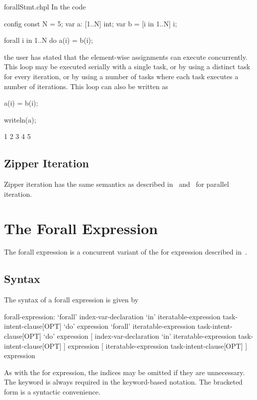 \begin{chapelexample}{forallStmt.chpl}
In the code
\begin{chapelpre}
config const N = 5;
var a: [1..N] int;
var b = [i in 1..N] i;
\end{chapelpre}
\begin{chapel}
forall i in 1..N do
  a(i) = b(i);
\end{chapel}
the user has stated that the element-wise assignments can execute
concurrently.  This loop may be executed serially with a single task,
or by using a distinct task for every iteration, or by using a number
of tasks where each task executes a number of iterations.  This loop
can also be written as
\begin{chapel}
[i in 1..N] a(i) = b(i);
\end{chapel}
\begin{chapelpost}
writeln(a);
\end{chapelpost}
\begin{chapeloutput}
1 2 3 4 5
\end{chapeloutput}
\end{chapelexample}

\subsection{Zipper Iteration}
\label{forall_zipper}

Zipper iteration has the same semantics as described
in~ and~ for parallel
iteration.

\pagebreak
\section{The Forall Expression}
\label{Forall_Expressions}

The forall expression is a concurrent variant of the for expression
described in~.

\subsection{Syntax}
\label{forall_expr_syntax}

The syntax of a forall expression is given by
\begin{syntax}
forall-expression:
  `forall' index-var-declaration `in' iteratable-expression task-intent-clause[OPT] `do' expression
  `forall' iteratable-expression task-intent-clause[OPT] `do' expression
  [ index-var-declaration `in' iteratable-expression task-intent-clause[OPT] ] expression
  [ iteratable-expression task-intent-clause[OPT] ] expression
\end{syntax}
As with the for expression, the indices may be omitted if they are
unnecessary.  The  keyword is always required in the
keyword-based notation.  The bracketed form is a syntactic
convenience.

